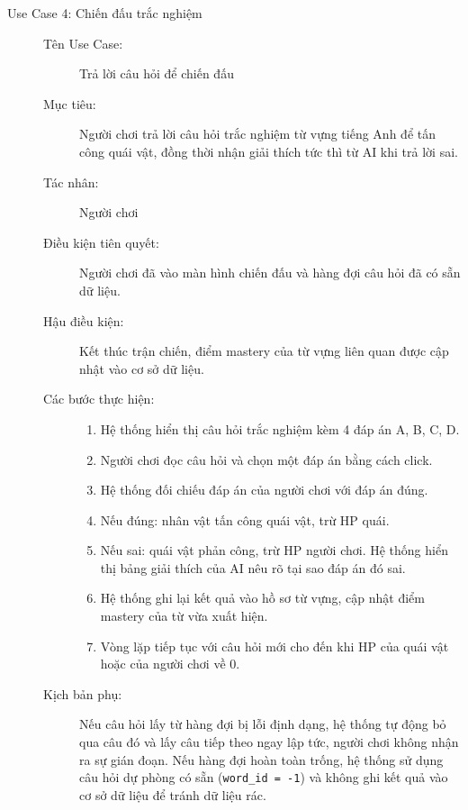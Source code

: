 \begin{description}
    \item[Use Case 4: Chiến đấu trắc nghiệm] \hfill
    \begin{description}
        \item[Tên Use Case:] Trả lời câu hỏi để chiến đấu
        \item[Mục tiêu:] Người chơi trả lời câu hỏi trắc nghiệm từ vựng tiếng Anh để tấn công quái vật, đồng thời nhận giải thích tức thì từ AI khi trả lời sai.
        \item[Tác nhân:] Người chơi
        \item[Điều kiện tiên quyết:] Người chơi đã vào màn hình chiến đấu và hàng đợi câu hỏi đã có sẵn dữ liệu.
        \item[Hậu điều kiện:] Kết thúc trận chiến, điểm mastery của từ vựng liên quan được cập nhật vào cơ sở dữ liệu.
        \item[Các bước thực hiện:] \hfill
        \begin{enumerate}
            \item Hệ thống hiển thị câu hỏi trắc nghiệm kèm 4 đáp án A, B, C, D.
            \item Người chơi đọc câu hỏi và chọn một đáp án bằng cách click.
            \item Hệ thống đối chiếu đáp án của người chơi với đáp án đúng.
            \item Nếu đúng: nhân vật tấn công quái vật, trừ HP quái.
            \item Nếu sai: quái vật phản công, trừ HP người chơi. Hệ thống hiển thị bảng giải thích của AI nêu rõ tại sao đáp án đó sai.
            \item Hệ thống ghi lại kết quả vào hồ sơ từ vựng, cập nhật điểm mastery của từ vừa xuất hiện.
            \item Vòng lặp tiếp tục với câu hỏi mới cho đến khi HP của quái vật hoặc của người chơi về 0.
        \end{enumerate}
        \item[Kịch bản phụ:] Nếu câu hỏi lấy từ hàng đợi bị lỗi định dạng, hệ thống tự động bỏ qua câu đó và lấy câu tiếp theo ngay lập tức, người chơi không nhận ra sự gián đoạn. Nếu hàng đợi hoàn toàn trống, hệ thống sử dụng câu hỏi dự phòng có sẵn (\texttt{word\_id = -1}) và không ghi kết quả vào cơ sở dữ liệu để tránh dữ liệu rác.
    \end{description}

    \vspace{0.3cm}


\end{description}
